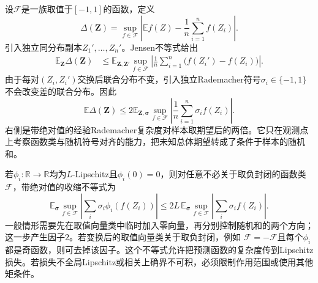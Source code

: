 设\(\mathcal{F}\)是一族取值于\([-1,1]\)的函数，定义
\[ \Delta(\bm{Z})
  =\sup_{f\in\mathcal{F}}\left|\mathbb{E}f(Z)-\frac{1}{n}\sum_{i=1}^{n}f(Z_i)\right|. \]
引入独立同分布副本\(Z_1',\ldots,Z_n'\)。Jensen不等式给出
\[
\begin{aligned}
  \mathbb{E}_{\bm{Z}}\Delta(\bm{Z})
  &\leq
  \mathbb{E}_{\bm{Z},\bm{Z}'}
  \sup_{f\in\mathcal{F}}
  \left|
    \frac{1}{n}\sum_{i=1}^{n}
    \bigl(f(Z_i')-f(Z_i)\bigr)
  \right|.
\end{aligned}
\]
由于每对\((Z_i,Z_i')\)交换后联合分布不变，引入独立Rademacher符号\(\sigma_i\in\{-1,1\}\)不会改变差的联合分布。因此
\[
  \mathbb{E}\Delta(\bm{Z})
  \leq
  2\mathbb{E}_{\bm{Z},\bm{\sigma}}
  \sup_{f\in\mathcal{F}}
  \left|
    \frac{1}{n}\sum_{i=1}^{n}\sigma_i f(Z_i)
  \right|.
\]
右侧是带绝对值的经验Rademacher复杂度对样本取期望后的两倍。它只在观测点上考察函数类与随机符号对齐的能力，把未知总体期望转成了条件于样本的随机和。

若\(\phi_i:\mathbb{R}\to\mathbb{R}\)均为\(L\)-Lipschitz且\(\phi_i(0)=0\)，则对任意不必关于取负封闭的函数类\(\mathcal{F}\)，带绝对值的收缩不等式为
\[
  \mathbb{E}_{\bm{\sigma}}
  \sup_{f\in\mathcal{F}}
  \left|
    \sum_i\sigma_i\phi_i(f(Z_i))
  \right|
  \leq
  2L\,
  \mathbb{E}_{\bm{\sigma}}
  \sup_{f\in\mathcal{F}}
  \left|
    \sum_i\sigma_i f(Z_i)
  \right|.
\]
一般情形需要先在取值向量类中临时加入零向量，再分别控制随机和的两个方向；这一步产生因子\(2\)。若变换后的取值向量类关于取负封闭，例如
\(\mathcal{F}=-\mathcal{F}\)且每个\(\phi_i\)都是奇函数，则可去掉该因子。这个不等式允许把预测函数的复杂度传到Lipschitz损失。若损失不全局Lipschitz或相关上确界不可积，必须限制作用范围或使用其他矩条件。

